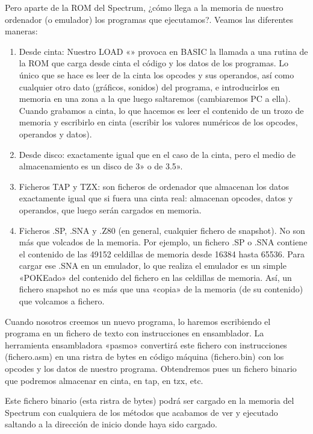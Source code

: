 \documentclass[letterpaper,10pt,spanish]{sphinxmanual}
\begin{document}
Pero aparte de la ROM del Spectrum, ¿cómo llega a la memoria de nuestro ordenador (o emulador) los programas que ejecutamos?. Veamos las diferentes maneras:
\begin{enumerate}
%
\item {} 
Desde cinta: Nuestro LOAD «» provoca en BASIC la llamada a una rutina de la ROM que carga desde cinta el código y los datos de los programas. Lo único que se hace es leer de la cinta los opcodes y sus operandos, así como cualquier otro dato (gráficos, sonidos) del programa, e introducirlos en memoria en una zona a la que luego saltaremos (cambiaremos PC a ella). Cuando grabamos a cinta, lo que hacemos es leer el contenido de un trozo de memoria y escribirlo en cinta (escribir los valores numéricos de los opcodes, operandos y datos).

\item {} 
Desde disco: exactamente igual que en el caso de la cinta, pero el medio de almacenamiento es un disco de 3» o de 3.5».

\item {} 
Ficheros TAP y TZX: son ficheros de ordenador que almacenan los datos exactamente igual que si fuera una cinta real: almacenan opcodes, datos y operandos, que luego serán cargados en memoria.

\item {} 
Ficheros .SP, .SNA y .Z80 (en general, cualquier fichero de snapshot). No son más que volcados de la memoria. Por ejemplo, un fichero .SP o .SNA contiene el contenido de las 49152 celdillas de memoria desde 16384 hasta 65536. Para cargar ese .SNA en un emulador, lo que realiza el emulador es un simple «POKEado» del contenido del fichero en las celdillas de memoria. Así, un fichero snapshot no es más que una «copia» de la memoria (de su contenido) que volcamos a fichero.

\end{enumerate}

Cuando nosotros creemos un nuevo programa, lo haremos escribiendo el programa en un fichero de texto con instrucciones en ensamblador. La herramienta ensambladora «pasmo» convertirá este fichero con instrucciones (fichero.asm) en una ristra de bytes en código máquina (fichero.bin) con los opcodes y los datos de nuestro programa. Obtendremos pues un fichero binario que podremos almacenar en cinta, en tap, en tzx, etc.

Este fichero binario (esta ristra de bytes) podrá ser cargado en la memoria del Spectrum con cualquiera de los métodos que acabamos de ver y ejecutado saltando a la dirección de inicio donde haya sido cargado.
\end{document}
